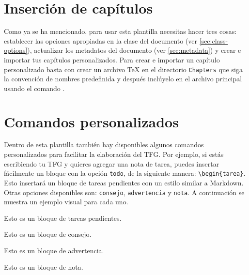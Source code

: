 \section{Inserción de capítulos}

Como ya se ha mencionado, para usar esta plantilla necesitas hacer tres cosas: establecer las opciones apropiadas en la clase del documento (ver \autoref{sec:class-options}), actualizar los metadatos del documento (ver \autoref{sec:metadata}) y crear e importar tus capítulos personalizados. Para crear e importar un capítulo personalizado basta con crear un archivo TeX en el directorio \texttt{Chapters} que siga la convención de nombres predefinida y después inclúyelo en el archivo principal usando el comando \verb||.

\section{Comandos personalizados}

Dentro de esta plantilla también hay disponibles algunos comandos personalizados para facilitar la elaboración del TFG. Por ejemplo, si estás escribiendo tu TFG y quieres agregar una nota de tarea, puedes insertar fácilmente un bloque con la opción \verb|todo|, de la siguiente manera: \verb|\begin{tarea}|. Esto insertará un bloque de tareas pendientes con un estilo similar a Markdown. Otras opciones disponibles son: \verb|consejo|, \verb|advertencia| y \verb|nota|. A continuación se muestra un ejemplo visual para cada uno.

\vspace{.875em}
\begin{tcbraster}[
    raster columns=2, 
    raster equal height, 
    nobeforeafter, 
    raster column skip=1cm
]
\begin{tarea}
    Esto es un bloque de tareas pendientes.
\end{tarea}
\begin{consejo}
    Esto es un bloque de consejo.
\end{consejo}
\end{tcbraster}

\begin{tcbraster}[
    raster columns=2, 
    raster equal height, 
    nobeforeafter, 
    raster column skip=1cm
]
\begin{advertencia}
    Esto es un bloque de advertencia.
\end{advertencia}
\begin{nota}
    Esto es un bloque de nota.
\end{nota}
\end{tcbraster}
\vspace{.875em}
